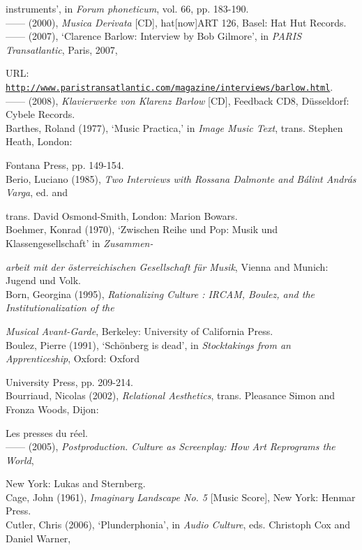instruments', in \emph{Forum phoneticum}, vol. 66, pp. 183-190.
\hypertarget{barlowcd}{}\\
------ (2000), \emph{Musica Derivata} [CD], hat[now]ART 126, Basel: Hat Hut Records. 
\hypertarget{barlowbob}{}\\
------ (2007), `Clarence Barlow: Interview by Bob Gilmore', in \emph{PARIS Transatlantic}, Paris, 2007, 

URL: \href{http://www.paristransatlantic.com/magazine/interviews/barlow.html}{\texttt {http://www.paristransatlantic.com/magazine/interviews/barlow.html}}.
\hypertarget{barlowpiano}{}\\
------ (2008), \emph{Klavierwerke von Klarenz Barlow} [CD], Feedback CD8, D\"{u}sseldorf: Cybele Records. 
\hypertarget{barthes}{}\\
Barthes, Roland (1977), `Music Practica,' in \emph{Image Music Text}, trans. Stephen Heath, London: 

Fontana Press, pp. 149-154. 
\hypertarget{berio}{}\\
Berio, Luciano (1985), \emph{Two Interviews with Rossana Dalmonte and B\'{a}lint Andr\'{a}s Varga},  ed. and 

trans. David Osmond-Smith, London: Marion Bowars. 
\hypertarget{boehmer}{}\\
Boehmer, Konrad (1970), `Zwischen Reihe und Pop: Musik und Klassengesellschaft' in \emph{Zusammen-}

\emph{arbeit mit der \"{o}sterreichischen Gesellschaft f\"{u}r Musik}, Vienna and Munich: Jugend und Volk.
\hypertarget{born}{}\\
Born, Georgina (1995), \emph{Rationalizing Culture : IRCAM, Boulez, and the Institutionalization of the}

\emph{Musical Avant-Garde}, Berkeley: University of California Press. 
\hypertarget{boulez}{}\\
Boulez, Pierre (1991), `Sch\"{o}nberg is dead', in \emph{Stocktakings from an Apprenticeship}, Oxford: Oxford 

University Press, pp. 209-214. 
\hypertarget{relational}{}\\
Bourriaud, Nicolas (2002), \emph{Relational Aesthetics}, trans. Pleasance Simon and Fronza Woods, Dijon: 

Les presses du r\'{e}el.
\hypertarget{postproduction}{}\\
------ (2005),  \emph{Postproduction. Culture as Screenplay: How Art Reprograms the World}, 

New York: Lukas and Sternberg.
\hypertarget{cage}{}\\
Cage, John (1961), \emph{Imaginary Landscape No. 5} [Music Score], New York: Henmar Press. 
\hypertarget{cutler}{}\\
Cutler, Chris (2006),  `Plunderphonia', in \emph{Audio Culture}, eds. Christoph Cox and Daniel Warner, 

